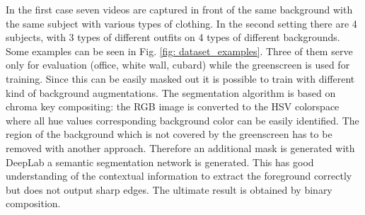 In the first case seven videos are captured in front of the same background with the same subject with various types of clothing. In the second setting there are 4 subjects, with 3 types of different outfits on 4 types of different backgrounds. Some examples can be seen in Fig. \ref{fig: dataset_examples}. Three of them serve only for evaluation (office, white wall, cubard) while the greenscreen is used for training. Since this can be easily masked out it is possible to train with different kind of background augmentations. 
The segmentation algorithm is based on chroma key compositing: the RGB image  is converted to the HSV colorspace where all hue values corresponding background color can be easily identified. The region of the background which is not covered by the greenscreen has to be removed with another approach. Therefore an additional mask is generated with DeepLab \cite{DBLP:journals/corr/ChenPK0Y16} a semantic segmentation network is generated. This has good understanding of the contextual information to extract the foreground correctly but does not output sharp edges. 
The ultimate result is obtained by binary composition. 
